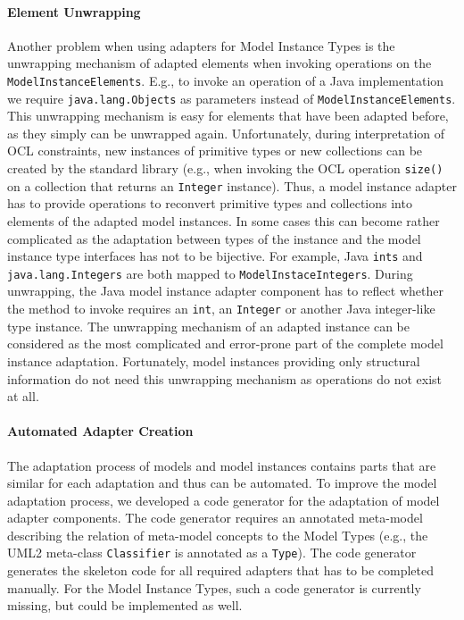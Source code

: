 	\paragraph{Element Unwrapping}
	Another problem when using adapters for Model Instance Types 
	is the unwrapping mechanism of adapted elements when invoking operations 
	on the \texttt{ModelInstanceElements}. E.g., to invoke an operation of a Java 
	implementation we require \texttt{java.lang.Objects} as parameters instead of 
	\texttt{ModelInstanceElements}. This unwrapping mechanism is easy 
	for elements that have been adapted before, as they simply can be unwrapped 
	again. Unfortunately, during interpretation of OCL constraints, 
	new instances of primitive types or new collections can be created 
	by the standard library (e.g., when invoking the OCL operation \texttt{size()} on a collection that 
	returns an \texttt{Integer} instance). Thus, a 
	model instance adapter has to provide operations to reconvert 
	primitive types and collections into elements of the adapted model 
	instances. In some cases this can become rather complicated as 
	the adaptation between types of the instance and the model 
	instance type interfaces has not to be bijective. For 
	example, Java \texttt{ints} and \texttt{java.lang.Integers} are 
	both mapped to \texttt{ModelInstaceIntegers}. During unwrapping, 
	the Java model instance adapter component has to reflect 
	whether the method to invoke requires an \texttt{int}, an 
	\texttt{Integer} or another Java integer-like type instance.
	The unwrapping mechanism of an adapted instance 
	can be considered as the most complicated and error-prone part 
	of the complete model instance adaptation.
	Fortunately, model instances providing only structural information do not
	need this unwrapping mechanism as operations do not exist at all.

	\paragraph{Automated Adapter Creation}
	The adaptation process of models and model 
	instances contains parts that are similar 
	for each adaptation and thus can be automated.
	To improve the model adaptation process, we developed a code generator 
	for the adaptation of model adapter components. The code 
	generator requires an annotated meta-model describing
	the relation of meta-model concepts to the Model Types (e.g., the UML2 meta-class
	\texttt{Classifier} is annotated as a \texttt{Type}). 
	The code generator generates the skeleton code for all required 
	adapters that has to be completed manually.
	For the Model Instance Types, such a code generator is currently 
	missing, but could be implemented as well.
	
